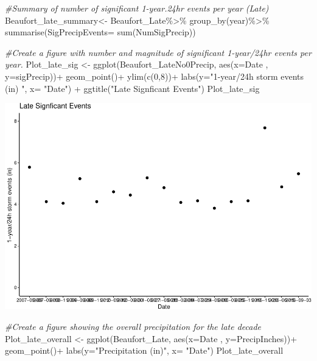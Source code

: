 \documentclass[
  12pt,
]{article}
\newenvironment{Shaded}{\begin{snugshade}}{\end{snugshade}}
\newcommand{\AttributeTok}[1]{\textcolor[rgb]{0.77,0.63,0.00}{#1}}
\newcommand{\CommentTok}[1]{\textcolor[rgb]{0.56,0.35,0.01}{\textit{#1}}}
\newcommand{\DecValTok}[1]{\textcolor[rgb]{0.00,0.00,0.81}{#1}}
\newcommand{\FunctionTok}[1]{\textcolor[rgb]{0.00,0.00,0.00}{#1}}
\newcommand{\NormalTok}[1]{#1}
\newcommand{\OtherTok}[1]{\textcolor[rgb]{0.56,0.35,0.01}{#1}}
\newcommand{\SpecialCharTok}[1]{\textcolor[rgb]{0.00,0.00,0.00}{#1}}
\newcommand{\StringTok}[1]{\textcolor[rgb]{0.31,0.60,0.02}{#1}}
\begin{document}
\begin{Shaded}
\begin{Highlighting}[]
\CommentTok{\#Summary of number of significant 1{-}year.24hr events per year (Late)}
\NormalTok{Beaufort\_late\_summary}\OtherTok{\textless{}{-}}\NormalTok{ Beaufort\_Late}\SpecialCharTok{\%\textgreater{}\%}
  \FunctionTok{group\_by}\NormalTok{(year)}\SpecialCharTok{\%\textgreater{}\%}
  \FunctionTok{summarise}\NormalTok{(}\AttributeTok{SigPrecipEvents=} \FunctionTok{sum}\NormalTok{(NumSigPrecip))}

\CommentTok{\#Create a figure with number and magnitude of significant 1{-}year/24hr events per year.}
\NormalTok{Plot\_late\_sig }\OtherTok{\textless{}{-}} \FunctionTok{ggplot}\NormalTok{(Beaufort\_LateNo0Precip, }\FunctionTok{aes}\NormalTok{(}\AttributeTok{x=}\NormalTok{Date , }\AttributeTok{y=}\NormalTok{sigPrecip))}\SpecialCharTok{+}
  \FunctionTok{geom\_point}\NormalTok{()}\SpecialCharTok{+}
  \FunctionTok{ylim}\NormalTok{(}\FunctionTok{c}\NormalTok{(}\DecValTok{0}\NormalTok{,}\DecValTok{8}\NormalTok{))}\SpecialCharTok{+}
  \FunctionTok{labs}\NormalTok{(}\AttributeTok{y=}\StringTok{"1{-}year/24h storm events (in) "}\NormalTok{, }\AttributeTok{x=} \StringTok{"Date"}\NormalTok{) }\SpecialCharTok{+}
  \FunctionTok{ggtitle}\NormalTok{(}\StringTok{"Late Signficant Events"}\NormalTok{)}
\NormalTok{Plot\_late\_sig}
\end{Highlighting}
\end{Shaded}

\includegraphics{Final_Project_Thornton_Katayama_Ngenzi_files/figure-latex/late-1.pdf}

\begin{Shaded}
\begin{Highlighting}[]
\CommentTok{\#Create a figure showing the overall precipitation for the late decade}
\NormalTok{Plot\_late\_overall }\OtherTok{\textless{}{-}} \FunctionTok{ggplot}\NormalTok{(Beaufort\_Late, }\FunctionTok{aes}\NormalTok{(}\AttributeTok{x=}\NormalTok{Date , }\AttributeTok{y=}\NormalTok{PrecipInches))}\SpecialCharTok{+}
  \FunctionTok{geom\_point}\NormalTok{()}\SpecialCharTok{+}
  \FunctionTok{labs}\NormalTok{(}\AttributeTok{y=}\StringTok{"Precipitation (in)"}\NormalTok{, }\AttributeTok{x=} \StringTok{"Date"}\NormalTok{)}
\NormalTok{Plot\_late\_overall}
\end{Highlighting}
\end{Shaded}
\end{document}
